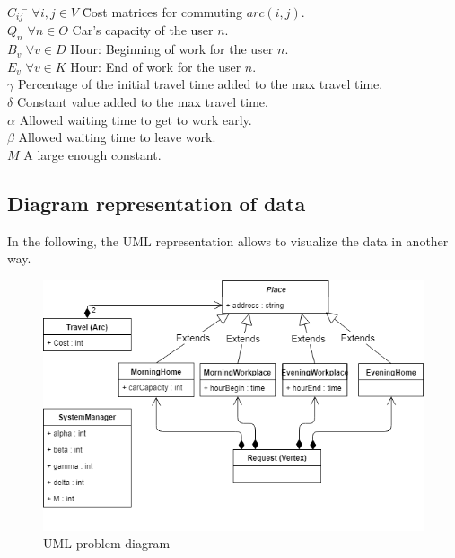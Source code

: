 \documentclass[12pt, a4paper, twoside]{memoir}
\newcommand\tab[1][1cm]{\hspace*{#1}}
\begin{document}
{	\begin{tabbing}
		$C_{ij}$ \tab \= $\forall i, j\in V$ \tab \= Cost matrices for commuting $arc(i, j)$. \\
		
		$Q_{n}$ \> $\forall n\in O$ \> Car's capacity of the user $n$. \\
		
		$B_{v}$ \> $\forall v\in D$ \> Hour: Beginning of work for the user $n$. \\
		$E_{v}$ \> $\forall v\in K$ \> Hour: End of work for the user $n$. \\
		
		$\gamma$ \> \> Percentage of the initial travel time added to the max travel time. \\
		$\delta$ \> \> Constant value added to the max travel time. \\
		$\alpha$ \> \> Allowed waiting time to get to work early. \\
		$\beta$ \> \> Allowed waiting time to leave work. \\
		
		$M$ \> \> A large enough constant. \\
	\end{tabbing}
	
	\subsection{Diagram representation of data}
	
	In the following, the UML representation allows to visualize the data in another way.
	
	\begin{figure}[H]
		\centering
		\begin{flushleft}
			\includegraphics[scale=0.7]{img/i_umlproblemdata.png}
		\end{flushleft}
		\caption{UML problem diagram}
		\label{fig:UML Diagram}
	\end{figure}
	
}
\end{document}
